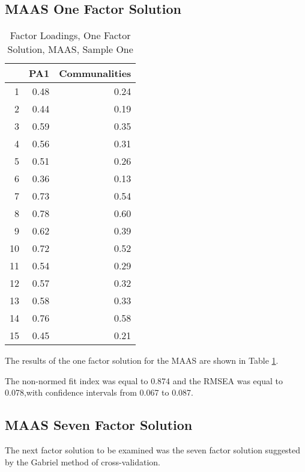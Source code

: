 \documentclass{article}
\begin{document}
\subsection{MAAS One Factor Solution}
\label{sec:maas-one-factor}



\begin{table}[ht]
\centering
\begin{tabular}{rrr}
  \hline
 & PA1 & Communalities \\ 
  \hline
1 & 0.48 & 0.24 \\ 
  2 & 0.44 & 0.19 \\ 
  3 & 0.59 & 0.35 \\ 
  4 & 0.56 & 0.31 \\ 
  5 & 0.51 & 0.26 \\ 
  6 & 0.36 & 0.13 \\ 
  7 & 0.73 & 0.54 \\ 
  8 & 0.78 & 0.60 \\ 
  9 & 0.62 & 0.39 \\ 
  10 & 0.72 & 0.52 \\ 
  11 & 0.54 & 0.29 \\ 
  12 & 0.57 & 0.32 \\ 
  13 & 0.58 & 0.33 \\ 
  14 & 0.76 & 0.58 \\ 
  15 & 0.45 & 0.21 \\ 
   \hline
\end{tabular}
\caption{Factor Loadings, One Factor Solution, MAAS, Sample One} 
\label{tab:hom1maas1fact}
\end{table}
The results of the one factor solution for the MAAS are shown in Table \ref{tab:hom1maas1fact}. 

The non-normed fit index was equal to 0.874
and the RMSEA was equal to 0.078,with confidence intervals from 0.067 to 0.087.



\subsection{MAAS Seven Factor Solution}
\label{sec:maas-seven-factor}

The next factor solution to be examined was the seven factor solution suggested by the Gabriel method of cross-validation.
\end{document}
